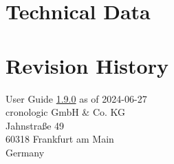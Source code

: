 \documentclass[12pt,notitlepage,a4paper]{report}
\newcommand{\ifxHPTDC}[2]{#1}
\newcommand{\ifxHPTDC}[2]{#2}
\newcommand{\ttinput}[1]{}
\newcommand{\ttinput}[1]{}
\newcommand{\ttinput}[1]{}
\newcommand{\ugrev}{{1.9.0}}
\begin{document}
    \chapter{Technical Data}    
        \ttinput{Tech.tex} 
        

    \ifxHPTDC{}{
    \chapter{Ordering Information} \label{cp:ordering_information}
        
    }

    
    \chapter{Revision History} 
        \noindent
        User Guide \hyperlink{ugrev}{\ugrev} as of 2024-06-27\\  %
        cronologic GmbH \& Co. KG\\
        Jahnstraße 49\\
        60318 Frankfurt am Main\\Germany\\
        \ttinput{FwRev.tex}
        \ifxHPTDC{}{} 
        

    \ifxHPTDC{}{
    \phantomsection
    \addcontentsline{toc}{chapter}{Erratum}
    \chapter*{Erratum}
        
    }
\end{document}

